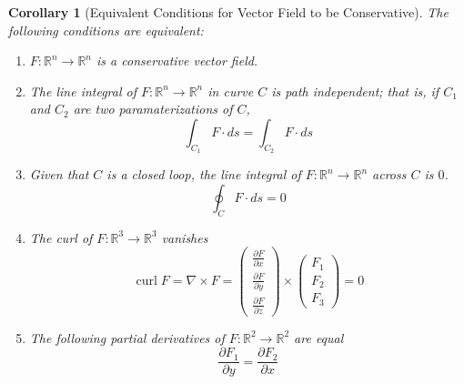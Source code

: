 \documentclass{article}
\DeclareMathOperator{\curl}{curl}
\newtheorem{corollary}{Corollary}[theorem]
\theoremstyle{remark}
\theoremstyle{definition}
\begin{document}
\begin{corollary}[Equivalent Conditions for Vector Field to be Conservative]
The following conditions are equivalent: 
\begin{enumerate}
    \item $F: \mathbb{R}^n \longrightarrow \mathbb{R}^n$ is a conservative vector field. 
    \item The line integral of $F: \mathbb{R}^n \longrightarrow \mathbb{R}^n$ in curve $C$ is path independent; that is, if $C_1$ and $C_2$ are two paramaterizations of $C$, 
    \[\int_{C_1} F \cdot ds = \int_{C_2} F \cdot ds\]
    \item Given that $C$ is a closed loop, the line integral of $F: \mathbb{R}^n \longrightarrow \mathbb{R}^n$ across $C$ is $0$. 
    \[\oint_C F \cdot ds = 0\]
    \item The curl of $F: \mathbb{R}^3 \longrightarrow \mathbb{R}^3$ vanishes
    \[\curl{F} = \nabla \times F = \begin{pmatrix}
    \frac{\partial F}{\partial x} \\\frac{\partial F}{\partial y} \\\frac{\partial F}{\partial z} 
    \end{pmatrix} \times \begin{pmatrix}
    F_1\\F_2\\F_3
    \end{pmatrix}= 0\]
    \item The following partial derivatives of $F: \mathbb{R}^2 \longrightarrow \mathbb{R}^2$ are equal
    \[\frac{\partial F_1}{\partial y} = \frac{\partial F_2}{\partial x}\]
\end{enumerate}
\end{corollary}
\end{document}
